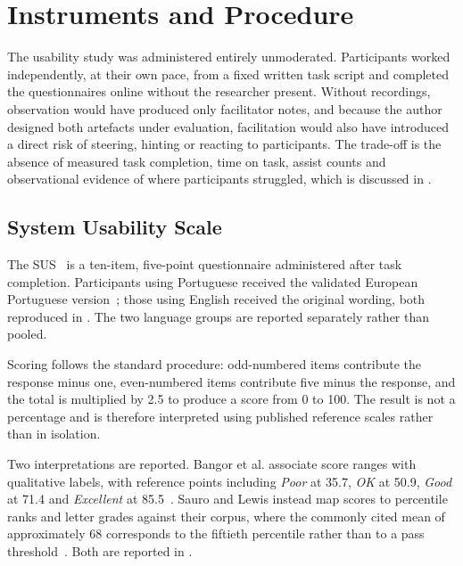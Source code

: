 \section{Instruments and Procedure}
\label{sec:eval_instruments_procedure}

The usability study was administered entirely unmoderated. Participants worked independently, at their own pace, from a fixed written task script and completed the questionnaires online without the researcher present. Without recordings, observation would have produced only facilitator notes, and because the author designed both artefacts under evaluation, facilitation would also have introduced a direct risk of steering, hinting or reacting to participants. The trade-off is the absence of measured task completion, time on task, assist counts and observational evidence of where participants struggled, which is discussed in .

\subsection{System Usability Scale}
\label{sec:sus}

The \ac{SUS}~\cite{Brooke:1996SUS} is a ten-item, five-point questionnaire administered after task completion. Participants using Portuguese received the validated European Portuguese version~\cite{Martins:2015SUS}; those using English received the original wording, both reproduced in . The two language groups are reported separately rather than pooled.

Scoring follows the standard procedure: odd-numbered items contribute the response minus one, even-numbered items contribute five minus the response, and the total is multiplied by 2.5 to produce a score from 0 to 100. The result is not a percentage and is therefore interpreted using published reference scales rather than in isolation.

Two interpretations are reported. Bangor et al. associate score ranges with qualitative labels, with reference points including \emph{Poor} at 35.7, \emph{OK} at 50.9, \emph{Good} at 71.4 and \emph{Excellent} at 85.5~\cite{Bangor:2009SUS}. Sauro and Lewis instead map scores to percentile ranks and letter grades against their corpus, where the commonly cited mean of approximately 68 corresponds to the fiftieth percentile rather than to a pass threshold~\cite{Sauro:2016QUANT}. Both are reported in .

